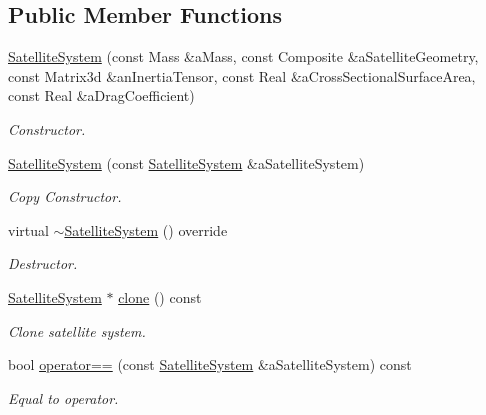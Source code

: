 \subsection*{Public Member Functions}
\begin{DoxyCompactItemize}
\item 
\hyperlink{classostk_1_1astro_1_1flight_1_1system_1_1_satellite_system_a92a2ae75e146b82f198b909e2c2787d7}{Satellite\+System} (const Mass \&a\+Mass, const Composite \&a\+Satellite\+Geometry, const Matrix3d \&an\+Inertia\+Tensor, const Real \&a\+Cross\+Sectional\+Surface\+Area, const Real \&a\+Drag\+Coefficient)
\begin{DoxyCompactList}\small\item\em Constructor. \end{DoxyCompactList}\item 
\hyperlink{classostk_1_1astro_1_1flight_1_1system_1_1_satellite_system_a0860dee3a62a1fd328cde50c6cf29abf}{Satellite\+System} (const \hyperlink{classostk_1_1astro_1_1flight_1_1system_1_1_satellite_system}{Satellite\+System} \&a\+Satellite\+System)
\begin{DoxyCompactList}\small\item\em Copy Constructor. \end{DoxyCompactList}\item 
virtual \hyperlink{classostk_1_1astro_1_1flight_1_1system_1_1_satellite_system_a9d49e1a03773c4d78ba6dc579b24b713}{$\sim$\+Satellite\+System} () override
\begin{DoxyCompactList}\small\item\em Destructor. \end{DoxyCompactList}\item 
\hyperlink{classostk_1_1astro_1_1flight_1_1system_1_1_satellite_system}{Satellite\+System} $\ast$ \hyperlink{classostk_1_1astro_1_1flight_1_1system_1_1_satellite_system_ab72eb53f29c3f6f9839eaefd5667f218}{clone} () const
\begin{DoxyCompactList}\small\item\em Clone satellite system. \end{DoxyCompactList}\item 
bool \hyperlink{classostk_1_1astro_1_1flight_1_1system_1_1_satellite_system_aa74775f808a686c2452a9868d72ab5ef}{operator==} (const \hyperlink{classostk_1_1astro_1_1flight_1_1system_1_1_satellite_system}{Satellite\+System} \&a\+Satellite\+System) const
\begin{DoxyCompactList}\small\item\em Equal to operator. \end{DoxyCompactList}\item 

\end{DoxyCompactItemize}

